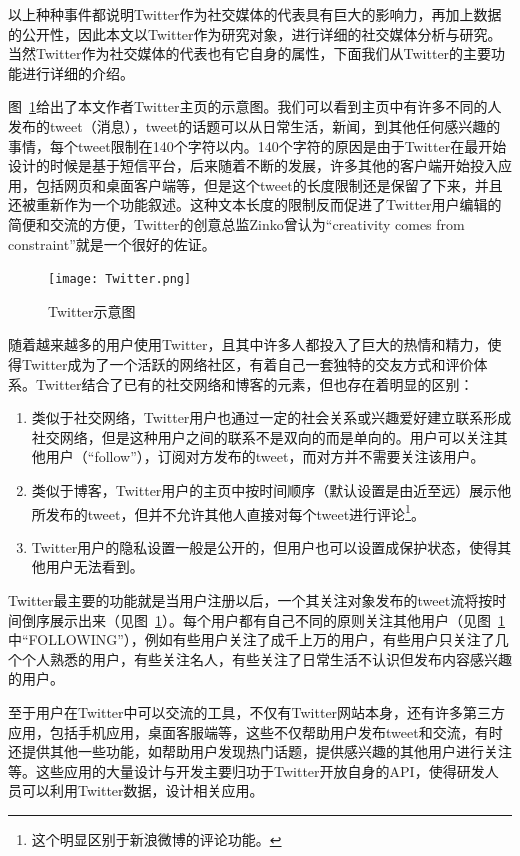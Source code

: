 以上种种事件都说明Twitter作为社交媒体的代表具有巨大的影响力，再加上数据的公开性，因此本文以Twitter作为研究对象，进行详细的社交媒体分析与研究。当然Twitter作为社交媒体的代表也有它自身的属性，下面我们从Twitter的主要功能进行详细的介绍。

图~\ref{Twitter}给出了本文作者Twitter主页的示意图。我们可以看到主页中有许多不同的人发布的tweet（消息），tweet的话题可以从日常生活，新闻，到其他任何感兴趣的事情，每个tweet限制在140个字符以内。140个字符的原因是由于Twitter在最开始设计的时候是基于短信平台，后来随着不断的发展，许多其他的客户端开始投入应用，包括网页和桌面客户端等，但是这个tweet的长度限制还是保留了下来，并且还被重新作为一个功能叙述。这种文本长度的限制反而促进了Twitter用户编辑的简便和交流的方便，Twitter的创意总监Zinko曾认为“creativity comes from constraint”就是一个很好的佐证。

\begin{figure}[htp]
\centering
\texttt{[image: Twitter.png]}
\caption{Twitter示意图}
\label{Twitter}
\end{figure}

随着越来越多的用户使用Twitter，且其中许多人都投入了巨大的热情和精力，使得Twitter成为了一个活跃的网络社区，有着自己一套独特的交友方式和评价体系。Twitter结合了已有的社交网络和博客的元素，但也存在着明显的区别：
   \begin{enumerate}
    \item 类似于社交网络，Twitter用户也通过一定的社会关系或兴趣爱好建立联系形成社交网络，但是这种用户之间的联系不是双向的而是单向的。用户可以关注其他用户（“follow”），订阅对方发布的tweet，而对方并不需要关注该用户。
    \item 类似于博客，Twitter用户的主页中按时间顺序（默认设置是由近至远）展示他所发布的tweet，但并不允许其他人直接对每个tweet进行评论\footnote{这个明显区别于新浪微博的评论功能。}。
     \item Twitter用户的隐私设置一般是公开的，但用户也可以设置成保护状态，使得其他用户无法看到。
  \end{enumerate}  

Twitter最主要的功能就是当用户注册以后，一个其关注对象发布的tweet流将按时间倒序展示出来（见图~\ref{Twitter}）。每个用户都有自己不同的原则关注其他用户（见图~\ref{Twitter}中“FOLLOWING”），例如有些用户关注了成千上万的用户，有些用户只关注了几个个人熟悉的用户，有些关注名人，有些关注了日常生活不认识但发布内容感兴趣的用户。

至于用户在Twitter中可以交流的工具，不仅有Twitter网站本身，还有许多第三方应用，包括手机应用，桌面客服端等，这些不仅帮助用户发布tweet和交流，有时还提供其他一些功能，如帮助用户发现热门话题，提供感兴趣的其他用户进行关注等。这些应用的大量设计与开发主要归功于Twitter开放自身的API，使得研发人员可以利用Twitter数据，设计相关应用。

